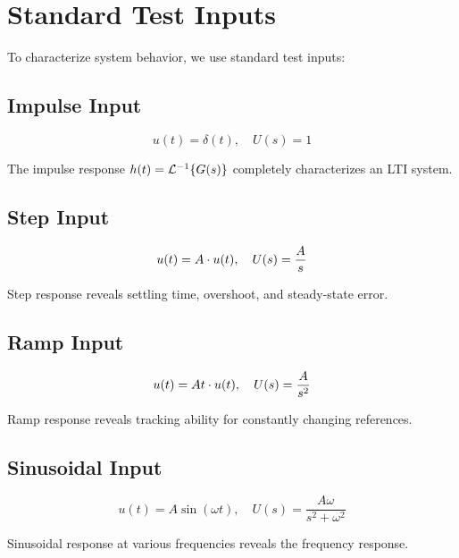 \chapter{Standard Test Inputs}
\label{ch:test_inputs}

To characterize system behavior, we use standard test inputs:

\section{Impulse Input}

\begin{equation}
u(t) = \delta(t), \quad U(s) = 1
\end{equation}

The impulse response $h(t) = \mathcal{L}^{-1}\{G(s)\}$ completely characterizes an LTI system.

\section{Step Input}

\begin{equation}
u(t) = A \cdot u(t), \quad U(s) = \frac{A}{s}
\end{equation}

Step response reveals settling time, overshoot, and steady-state error.

\section{Ramp Input}

\begin{equation}
u(t) = At \cdot u(t), \quad U(s) = \frac{A}{s^2}
\end{equation}

Ramp response reveals tracking ability for constantly changing references.

\section{Sinusoidal Input}

\begin{equation}
u(t) = A\sin(\omega t), \quad U(s) = \frac{A\omega}{s^2 + \omega^2}
\end{equation}

Sinusoidal response at various frequencies reveals the frequency response.

